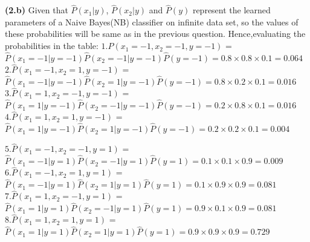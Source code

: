 \documentclass{article}
\renewcommand\part[1]{\vspace{.10in}\textbf{(#1)}}
\begin{document}
 \part{2.b}
	Given that $\hat{P}(x_1 | y)$, $\hat{P}(x_2 | y)$ and $\hat{P}(y)$ represent the learned parameters of a Naive Bayes(NB) classifier on infinite data set, so the values of these probabilities will be same as in the previous question. Hence,evaluating the probabilities in the table: \newline
	$1. \hat{P}(x_1 = -1,x_2 = -1,y = -1 )$ = $\hat{P}(x_1= -1| y=-1 )\hat{P}(x_2= -1| y= -1)\hat{P}(y= -1) = 0.8\times 0.8 \times 0.1 = 0.064$ \newline
	$2. \hat{P}(x_1 =-1 ,x_2 =1 ,y = -1 )$ = $\hat{P}(x_1=-1 | y=-1 )\hat{P}(x_2=1 | y= -1)\hat{P}(y= -1) = 0.8 \times 0.2 \times 0.1 = 0.016$ \newline
	$3. \hat{P}(x_1 = 1,x_2 =-1 ,y = -1 )$ = $\hat{P}(x_1=1 | y=-1 )\hat{P}(x_2=-1 | y= -1)\hat{P}(y= -1) = 0.2\times 0.8 \times 0.1 = 0.016$ \newline
	$4. \hat{P}(x_1 =1 ,x_2 =1 ,y = -1 )$ = $\hat{P}(x_1=1 | y=-1 )\hat{P}(x_2= 1| y= -1)\hat{P}(y= -1) = 0.2 \times 0.2 \times 0.1 = 0.004$ \newline

 
	$5. \hat{P}(x_1 = -1,x_2 = -1,y = 1 )$ = $\hat{P}(x_1= -1| y=1 )\hat{P}(x_2= -1| y= 1)\hat{P}(y= 1) = 0.1\times 0.1 \times 0.9 = 0.009$ \newline
	$6. \hat{P}(x_1 =-1 ,x_2 =1 ,y = 1 )$ = $\hat{P}(x_1=-1 | y=1 )\hat{P}(x_2=1 | y= 1)\hat{P}(y= 1) = 0.1 \times 0.9 \times 0.9 = 0.081$ \newline
	$7. \hat{P}(x_1 = 1,x_2 =-1 ,y = 1 )$ = $\hat{P}(x_1=1 | y=1 )\hat{P}(x_2=-1 | y= 1)\hat{P}(y= 1) = 0.9\times 0.1 \times 0.9 = 0.081$ \newline
	$8. \hat{P}(x_1 =1 ,x_2 =1 ,y = 1 )$ = $\hat{P}(x_1=1 | y=1 )\hat{P}(x_2= 1| y= 1)\hat{P}(y= 1) = 0.9 \times 0.9 \times 0.9 = 0.729$ \newline
\end{document}
